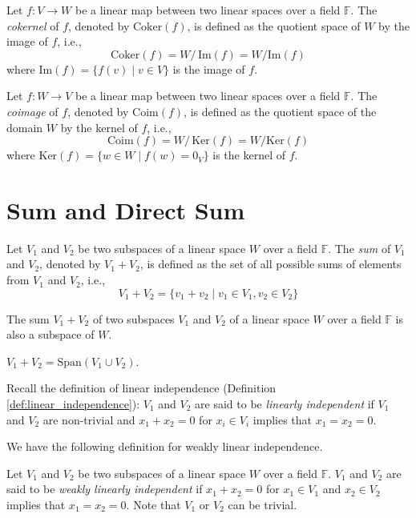 \documentclass[
	11pt, %
	fleqn, %
	a4paper, %
]{LegrandOrangeBook}
\renewcommand{\ker}[1]{\text{Ker}(#1)} %
\renewcommand{\Im}[1]{\text{Im}(#1)} %
\renewcommand{\span}[1]{\text{Span}(#1)} %
\newcommand{\quotient}[2]{#1 /\, #2} %
\newcommand{\F}{\mathbb{F}} %
\newcommand{\coker}[1]{\text{Coker}(#1)} %
\newcommand{\coim}[1]{\text{Coim}(#1)} %
\begin{document}
\begin{definition}[Cokernel]
    Let $f : V \to W$ be a linear map between two linear spaces over a field $\F$. The \emph{cokernel} of $f$, denoted by $\coker{f}$, is defined as the quotient space of $W$ by the image of $f$, i.e., 
    \[
        \coker{f} = \quotient{W}{\Im{f}} = W / \Im{f}
    \]
    where $\Im{f} = \{ f(v) \mid v \in V \}$ is the image of $f$.
\end{definition}

\begin{definition}[Coimage]
    Let $f : W \to V$ be a linear map between two linear spaces over a field $\F$. The \emph{coimage} of $f$, denoted by $\coim{f}$, is defined as the quotient space of the domain $W$ by the kernel of $f$, i.e.,
    \[
        \coim{f} = \quotient{W}{\ker{f}} = W / \ker{f}
    \]
    where $\ker{f} = \{ w \in W \mid f(w) = 0_V \}$ is the kernel of $f$.
\end{definition}

\newpage

\section{Sum and Direct Sum}

\begin{definition}
    Let $V_1$ and $V_2$ be two subspaces of a linear space $W$ over a field $\F$. The \emph{sum} of $V_1$ and $V_2$, denoted by $V_1 + V_2$, is defined as the set of all possible sums of elements from $V_1$ and $V_2$, i.e.,
    \[
        V_1 + V_2 = \{ v_1 + v_2 \mid v_1 \in V_1, v_2 \in V_2 \}
    \]
\end{definition}

\begin{proposition}
    The sum $V_1 + V_2$ of two subspaces $V_1$ and $V_2$ of a linear space $W$ over a field $\F$ is also a subspace of $W$.
\end{proposition}

\begin{proposition}
    $V_1 + V_2 = \span{V_1 \cup V_2}$.
\end{proposition}

Recall the definition of linear independence (Definition \ref{def:linear_independence}): $V_1$ and $V_2$ are said to be \emph{linearly independent} if $V_1$ and $V_2$ are non-trivial and $x_1 + x_2 = 0$ for $x_i \in V_i$ implies that $x_1 = x_2 = 0$.

We have the following definition for weakly linear independence.
\begin{definition}
    Let $V_1$ and $V_2$ be two subspaces of a linear space $W$ over a field $\F$. $V_1$ and $V_2$ are said to be \emph{weakly linearly independent} if $x_1 + x_2 = 0$ for $x_1 \in V_1$ and $x_2 \in V_2$ implies that $x_1 = x_2 = 0$. Note that $V_1$ or $V_2$ can be trivial.
\end{definition}
\end{document}
